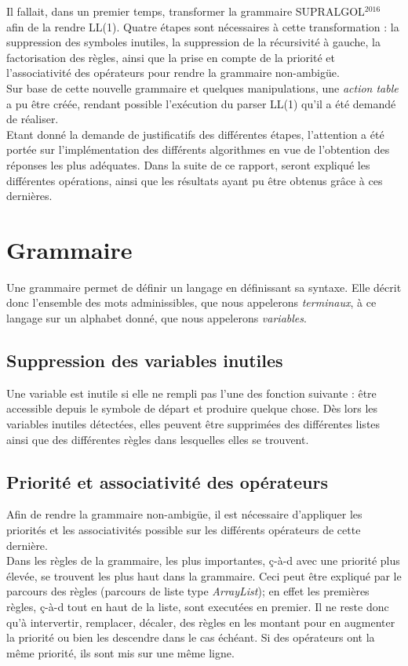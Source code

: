 \documentclass[pdftex,10pt,a4paper]{article}
\begin{document}
Il fallait, dans un premier temps, transformer la grammaire SUPRALGOL$^{2016}$ afin de la rendre LL(1). Quatre étapes sont nécessaires à cette transformation : la suppression des symboles inutiles, la suppression de la récursivité à gauche, la factorisation des règles, ainsi que la prise en compte de la priorité et l'associativité des opérateurs pour rendre la grammaire non-ambigüe.\\ Sur base de cette nouvelle grammaire et quelques manipulations, une \textit{action table} a pu être créée, rendant possible l'exécution du parser LL(1) qu'il a été demandé de réaliser.\\

Etant donné la demande de justificatifs des différentes étapes, l'attention a été portée sur l'implémentation des différents algorithmes en vue de l'obtention des réponses les plus adéquates. Dans la suite de ce rapport, seront expliqué les différentes opérations, ainsi que les résultats ayant pu être obtenus grâce à ces dernières.

\section{Grammaire}

Une grammaire permet de définir un langage en définissant sa syntaxe. Elle décrit donc l'ensemble des mots adminissibles, que nous appelerons \textit{terminaux}, à ce langage sur un alphabet donné, que nous appelerons \textit{variables}. 

\subsection{Suppression des variables inutiles}

Une variable est inutile si elle ne rempli pas l'une des fonction suivante : être accessible depuis le symbole de départ et produire quelque chose. Dès lors les variables inutiles détectées, elles peuvent être supprimées des différentes listes ainsi que des différentes règles dans lesquelles elles se trouvent. 

\subsection{Priorité et associativité des opérateurs}
Afin de rendre la grammaire non-ambigüe, il est nécessaire d'appliquer les priorités et les associativités possible sur les différents opérateurs de cette dernière.\\ Dans les règles de la grammaire, les plus importantes, ç-à-d avec une priorité plus élevée, se trouvent les plus haut dans la grammaire. Ceci peut être expliqué par le parcours des règles (parcours de liste type \textit{ArrayList}); en effet les premières règles, ç-à-d tout en haut de la liste, sont executées en premier. Il ne reste donc qu'à intervertir, remplacer, décaler, des règles en les montant pour en augmenter la priorité ou bien les descendre dans le cas échéant. Si des opérateurs ont la même priorité, ils sont mis sur une même ligne.
\end{document}
